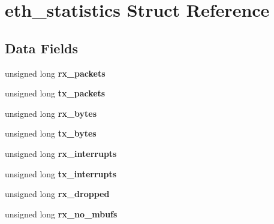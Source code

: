 \hypertarget{structeth__statistics}{}\section{eth\+\_\+statistics Struct Reference}
\label{structeth__statistics}
\subsection*{Data Fields}
\begin{DoxyCompactItemize}
\item 
\mbox{\label{structeth__statistics_aff024ea93b4bd466b55c390458316f9f}} 
unsigned long {\bfseries rx\+\_\+packets}
\item 
\mbox{\label{structeth__statistics_a4cab87e9a84f71971e8f3e6bd8dc41e3}} 
unsigned long {\bfseries tx\+\_\+packets}
\item 
\mbox{\label{structeth__statistics_ab71032c8654642d40ad49dd104ebd602}} 
unsigned long {\bfseries rx\+\_\+bytes}
\item 
\mbox{\label{structeth__statistics_a32a3cb3e699c0aa472fe89fe337c3a00}} 
unsigned long {\bfseries tx\+\_\+bytes}
\item 
\mbox{\label{structeth__statistics_ac23cd30deb53ff70d8c70a83f15b2d1b}} 
unsigned long {\bfseries rx\+\_\+interrupts}
\item 
\mbox{\label{structeth__statistics_aeef893e62c6270c5ea46ddba77229529}} 
unsigned long {\bfseries tx\+\_\+interrupts}
\item 
\mbox{\label{structeth__statistics_a08e25a0168f4bf7f2d8024828753eb86}} 
unsigned long {\bfseries rx\+\_\+dropped}
\item 
\mbox{\label{structeth__statistics_a126fce8d458aa1a3184bf951134b2f4f}} 
unsigned long {\bfseries rx\+\_\+no\+\_\+mbufs}
\item 
\mbox{\label{structeth__statistics_a73ea7b5b95e5dbcccfe48da6dc4cf88c}} 

\end{DoxyCompactItemize}
